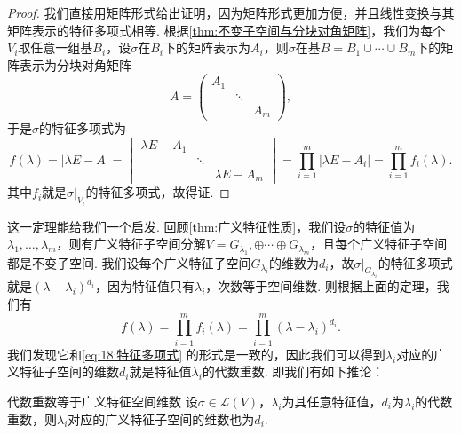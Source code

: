 \begin{proof}
    我们直接用矩阵形式给出证明，因为矩阵形式更加方便，并且线性变换与其矩阵表示的特征多项式相等. 根据\autoref{thm:不变子空间与分块对角矩阵}，我们为每个$V_i$取任意一组基$B_i$，设$\sigma$在$B_i$下的矩阵表示为$A_i$，则$\sigma$在基$B=B_1\cup\cdots\cup B_m$下的矩阵表示为分块对角矩阵
    \[A=\begin{pmatrix}
            A_1 &        &     \\
                & \ddots &     \\
                &        & A_m
        \end{pmatrix},\]
    于是$\sigma$的特征多项式为
    \[f(\lambda)=|\lambda E-A|=\begin{vmatrix}
            \lambda E-A_1 &        &               \\
                          & \ddots &               \\
                          &        & \lambda E-A_m
        \end{vmatrix}=\prod_{i=1}^m|\lambda E-A_i|=\prod_{i=1}^m f_i(\lambda).\]
    其中$f_i$就是$\sigma\vert_{V_i}$的特征多项式，故得证.
\end{proof}

这一定理能给我们一个启发. 回顾\autoref{thm:广义特征性质}，我们设$\sigma$的特征值为$\lambda_1,\ldots,\lambda_m$，则有广义特征子空间分解$V=G_{\lambda_1},\oplus\cdots\oplus G_{\lambda_m}$，且每个广义特征子空间都是不变子空间. 我们设每个广义特征子空间$G_{\lambda_i}$的维数为$d_i$，故$\sigma\vert_{G_{\lambda_i}}$的特征多项式就是$(\lambda-\lambda_i)^{d_i}$，因为特征值只有$\lambda_i$，次数等于空间维数. 则根据上面的定理，我们有
\[f(\lambda)=\prod_{i=1}^m f_i(\lambda)=\prod_{i=1}^m (\lambda-\lambda_i)^{d_i}.\]
我们发现它和\autoref{eq:18:特征多项式} 的形式是一致的，因此我们可以得到$\lambda_i$对应的广义特征子空间的维数$d_i$就是特征值$\lambda_i$的代数重数. 即我们有如下推论：
\begin{corollary}{}{代数重数等于广义特征空间维数}
    设$\sigma\in \mathcal{L}(V)$，$\lambda_i$为其任意特征值，$d_i$为$\lambda_i$的代数重数，则$\lambda_i$对应的广义特征子空间的维数也为$d_i$.
\end{corollary}



